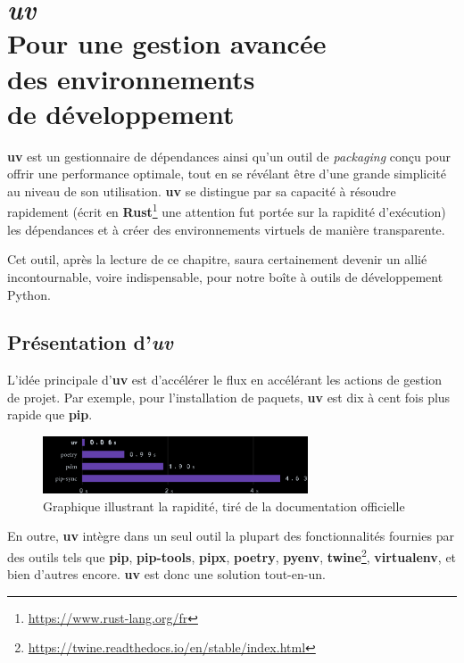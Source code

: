 \chapter[\textit{uv}]{\textit{uv} \\ Pour une gestion avancée \\ des environnements \\ de développement}

\bigskip

\textbf{uv} est un gestionnaire de dépendances ainsi qu'un outil de \textit{packaging} conçu pour offrir une performance optimale, tout en se révélant être d'une grande simplicité au niveau de son utilisation. \textbf{uv} se distingue par sa capacité à résoudre rapidement (écrit en \textbf{Rust}\footnote{\url{https://www.rust-lang.org/fr}} une attention fut portée sur la rapidité d'exécution) les dépendances et à créer des environnements virtuels de manière transparente.

Cet outil, après la lecture de ce chapitre, saura certainement devenir un allié incontournable, voire indispensable, pour notre boîte à outils de développement Python.

\section{Présentation d'\textit{uv}}
L'idée principale d'\textbf{uv} est d'accélérer le flux en accélérant les actions de gestion de projet. Par exemple, pour l'installation de paquets, \textbf{uv} est dix à cent fois plus rapide que \textbf{pip}.

\begin{figure}[!ht]
    \centering
    \includegraphics[width=0.7\textwidth]{IMG/uv_graph.png} %
    \caption{Graphique illustrant la rapidité, tiré de la documentation officielle}
\end{figure}

En outre, \textbf{uv} intègre dans un seul outil la plupart des fonctionnalités fournies par des outils tels que \textbf{pip}, \textbf{pip-tools}, \textbf{pipx}, \textbf{poetry}, \textbf{pyenv}, \textbf{twine}\footnote{\url{https://twine.readthedocs.io/en/stable/index.html}}, \textbf{virtualenv}, et bien d'autres encore. \textbf{uv} est donc une solution tout-en-un.

